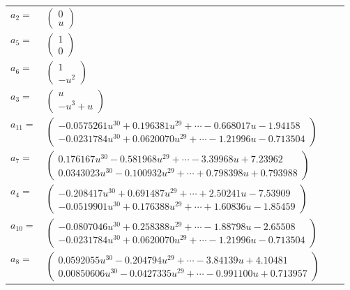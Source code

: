 \documentclass[1p]{elsarticle_modified}
\theoremstyle{definition}
\begin{document}
\begin{tabular}{m{7pt} m{180pt} m{7pt} m{180pt} }
\flushright $a_{2}=$&$\begin{pmatrix}0\\u\end{pmatrix}$ \\
\flushright $a_{5}=$&$\begin{pmatrix}1\\0\end{pmatrix}$ \\
\flushright $a_{6}=$&$\begin{pmatrix}1\\- u^2\end{pmatrix}$ \\
\flushright $a_{3}=$&$\begin{pmatrix}u\\- u^3+u\end{pmatrix}$ \\
\flushright $a_{11}=$&$\begin{pmatrix}-0.0575261 u^{30}+0.196381 u^{29}+\cdots-0.668017 u-1.94158\\-0.0231784 u^{30}+0.0620070 u^{29}+\cdots-1.21996 u-0.713504\end{pmatrix}$ \\
\flushright $a_{7}=$&$\begin{pmatrix}0.176167 u^{30}-0.581968 u^{29}+\cdots-3.39968 u+7.23962\\0.0343023 u^{30}-0.100932 u^{29}+\cdots+0.798398 u+0.793988\end{pmatrix}$ \\
\flushright $a_{4}=$&$\begin{pmatrix}-0.208417 u^{30}+0.691487 u^{29}+\cdots+2.50241 u-7.53909\\-0.0519901 u^{30}+0.176388 u^{29}+\cdots+1.60836 u-1.85459\end{pmatrix}$ \\
\flushright $a_{10}=$&$\begin{pmatrix}-0.0807046 u^{30}+0.258388 u^{29}+\cdots-1.88798 u-2.65508\\-0.0231784 u^{30}+0.0620070 u^{29}+\cdots-1.21996 u-0.713504\end{pmatrix}$ \\
\flushright $a_{8}=$&$\begin{pmatrix}0.0592055 u^{30}-0.204794 u^{29}+\cdots-3.84139 u+4.10481\\0.00850606 u^{30}-0.0427335 u^{29}+\cdots-0.991100 u+0.713957\end{pmatrix}$ \\

\end{tabular}
\end{document}

